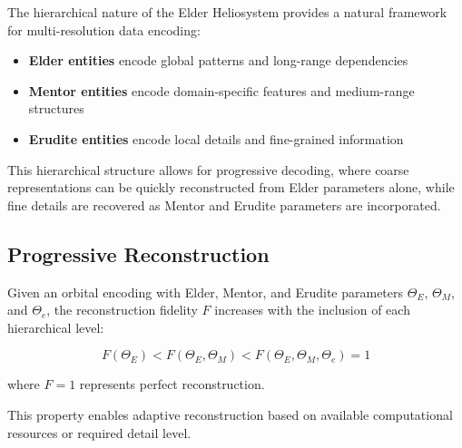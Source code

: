 The hierarchical nature of the Elder Heliosystem provides a natural framework for multi-resolution data encoding:

\begin{itemize}
    \item \textbf{Elder entities} encode global patterns and long-range dependencies
    \item \textbf{Mentor entities} encode domain-specific features and medium-range structures
    \item \textbf{Erudite entities} encode local details and fine-grained information
\end{itemize}

This hierarchical structure allows for progressive decoding, where coarse representations can be quickly reconstructed from Elder parameters alone, while fine details are recovered as Mentor and Erudite parameters are incorporated.

\subsection{Progressive Reconstruction}

\begin{proposition}
Given an orbital encoding with Elder, Mentor, and Erudite parameters $\Theta_E$, $\Theta_M$, and $\Theta_e$, the reconstruction fidelity $F$ increases with the inclusion of each hierarchical level:

\begin{equation}
F(\Theta_E) < F(\Theta_E, \Theta_M) < F(\Theta_E, \Theta_M, \Theta_e) = 1
\end{equation}

where $F=1$ represents perfect reconstruction.
\end{proposition}

This property enables adaptive reconstruction based on available computational resources or required detail level.


